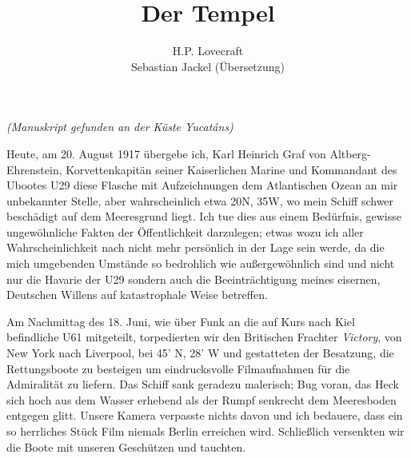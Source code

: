 \documentclass[a4paper]{memoir}
\begin{document}
\title{Der Tempel}
\author{H.P. Lovecraft\\
		Sebastian Jackel (Übersetzung)}
\date{}
\maketitle

\begin{center}
\textit{(Manuskript gefunden an der Küste Yucatáns)}
\end{center}

Heute, am 20. August 1917 übergebe ich, Karl Heinrich Graf von Altberg-\-Ehren\-stein, Korvettenkapitän seiner Kaiserlichen Marine und Kommandant des Ubootes U29 diese Flasche mit Aufzeichnungen dem Atlantischen Ozean an mir unbekannter Stelle, aber wahrscheinlich etwa 20\textdegree N, 35\textdegree W, wo mein Schiff schwer beschädigt auf dem Meeresgrund liegt. Ich tue dies aus einem Bedürfnis, gewisse ungewöhnliche Fakten der Öffentlichkeit darzulegen; etwas wozu ich aller Wahrscheinlichkeit nach nicht mehr persönlich in der Lage sein werde, da die mich umgebenden Umstände so bedrohlich wie außergewöhnlich sind und nicht nur die Havarie der U29 sondern auch die Beeinträchtigung meines eisernen, Deutschen Willens auf katastrophale Weise betreffen.

Am Nachmittag des 18. Juni, wie über Funk an die auf Kurs nach Kiel befindliche U61 mitgeteilt, torpedierten wir den Britischen Frachter \textit{Victory}, von New York nach Liverpool, bei 45' N, 28' W und gestatteten der Besatzung, die Rettungsboote zu besteigen um eindrucksvolle Filmaufnahmen für die Admiralität zu liefern. Das Schiff sank geradezu malerisch; Bug voran, das Heck sich hoch aus dem Wasser erhebend als der Rumpf senkrecht dem Meeresboden entgegen glitt. Unsere Kamera verpasste nichts davon und ich bedauere, dass ein so herrliches Stück Film niemals Berlin erreichen wird. Schließlich versenkten wir die Boote mit unseren Geschützen und tauchten.
\end{document}
